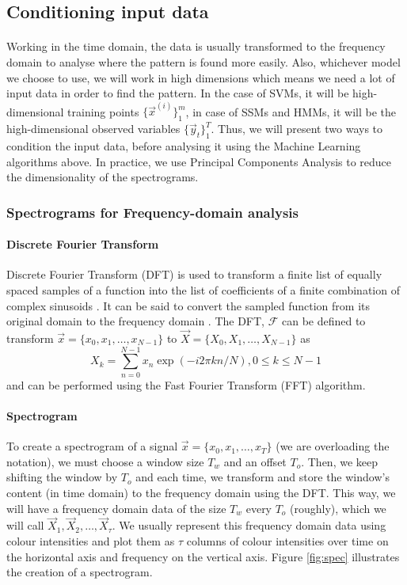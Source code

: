 \subsection{Conditioning input data}
\paragraph{}
	Working in the time domain, the data is usually transformed to the frequency domain to analyse where the pattern is found more easily. Also, whichever model we choose to use, we will work in high dimensions which means we need a lot of input data in order to find the pattern. In the case of SVMs, it will be high-dimensional training points $\{\vec x^{(i)}\}_1^m$, in case of SSMs and HMMs, it will be the high-dimensional observed variables $\{\vec y_t\}_1^T$. Thus, we will present two ways to condition the input data, before analysing it using the Machine Learning algorithms above. In practice, we use Principal Components Analysis to reduce the dimensionality of the spectrograms.
\subsubsection{Spectrograms for Frequency-domain analysis}
\paragraph{Discrete Fourier Transform}
	Discrete Fourier Transform (DFT) is used to transform a finite list of equally spaced samples of a function into the list of coefficients of a finite combination of complex sinusoids \cite{wiki:DFT}. It can be said to convert the sampled function from its original domain to the frequency domain \cite{wiki:DFT}. The DFT, $\mathcal{F}$ can be defined to transform $\vec x = \{x_0, x_1, \dotsc, x_{N - 1}\}$ to $\vec X = \{X_0, X_1, \dotsc, X_{N - 1}\}$ as
\begin{equation}
	X_k = \sum_{n = 0}^{N - 1} x_n \exp{(-i2\pi k n / N)}, 0 \leq k \leq N - 1
\end{equation}
and can be performed using the Fast Fourier Transform (FFT) algorithm.

\paragraph{Spectrogram}
	To create a spectrogram of a signal $\vec x = \{x_0, x_1, \dotsc, x_T\}$ (we are overloading the notation), we must choose a window size $T_w$ and an offset $T_o$. Then, we keep shifting the window by $T_o$ and each time, we transform and store the window's content (in time domain) to the frequency domain using the DFT. This way, we will have a frequency domain data of the size $T_w$ every $T_o$ (roughly), which we will call $\vec X_1, \vec X_2, \dotsc, \vec X_\tau$. We usually represent this frequency domain data using colour intensities and plot them as $\tau$ columns of colour intensities over time on the horizontal axis and frequency on the vertical axis. Figure \ref{fig:spec} illustrates the creation of a spectrogram.

